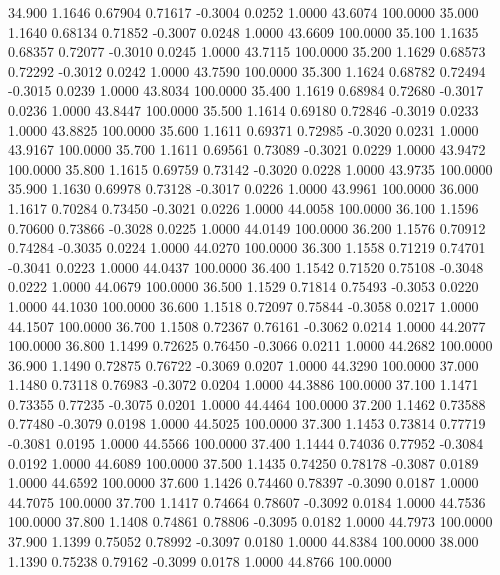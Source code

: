   34.900   1.1646   0.67904   0.71617  -0.3004   0.0252   1.0000  43.6074 100.0000
  35.000   1.1640   0.68134   0.71852  -0.3007   0.0248   1.0000  43.6609 100.0000
  35.100   1.1635   0.68357   0.72077  -0.3010   0.0245   1.0000  43.7115 100.0000
  35.200   1.1629   0.68573   0.72292  -0.3012   0.0242   1.0000  43.7590 100.0000
  35.300   1.1624   0.68782   0.72494  -0.3015   0.0239   1.0000  43.8034 100.0000
  35.400   1.1619   0.68984   0.72680  -0.3017   0.0236   1.0000  43.8447 100.0000
  35.500   1.1614   0.69180   0.72846  -0.3019   0.0233   1.0000  43.8825 100.0000
  35.600   1.1611   0.69371   0.72985  -0.3020   0.0231   1.0000  43.9167 100.0000
  35.700   1.1611   0.69561   0.73089  -0.3021   0.0229   1.0000  43.9472 100.0000
  35.800   1.1615   0.69759   0.73142  -0.3020   0.0228   1.0000  43.9735 100.0000
  35.900   1.1630   0.69978   0.73128  -0.3017   0.0226   1.0000  43.9961 100.0000
  36.000   1.1617   0.70284   0.73450  -0.3021   0.0226   1.0000  44.0058 100.0000
  36.100   1.1596   0.70600   0.73866  -0.3028   0.0225   1.0000  44.0149 100.0000
  36.200   1.1576   0.70912   0.74284  -0.3035   0.0224   1.0000  44.0270 100.0000
  36.300   1.1558   0.71219   0.74701  -0.3041   0.0223   1.0000  44.0437 100.0000
  36.400   1.1542   0.71520   0.75108  -0.3048   0.0222   1.0000  44.0679 100.0000
  36.500   1.1529   0.71814   0.75493  -0.3053   0.0220   1.0000  44.1030 100.0000
  36.600   1.1518   0.72097   0.75844  -0.3058   0.0217   1.0000  44.1507 100.0000
  36.700   1.1508   0.72367   0.76161  -0.3062   0.0214   1.0000  44.2077 100.0000
  36.800   1.1499   0.72625   0.76450  -0.3066   0.0211   1.0000  44.2682 100.0000
  36.900   1.1490   0.72875   0.76722  -0.3069   0.0207   1.0000  44.3290 100.0000
  37.000   1.1480   0.73118   0.76983  -0.3072   0.0204   1.0000  44.3886 100.0000
  37.100   1.1471   0.73355   0.77235  -0.3075   0.0201   1.0000  44.4464 100.0000
  37.200   1.1462   0.73588   0.77480  -0.3079   0.0198   1.0000  44.5025 100.0000
  37.300   1.1453   0.73814   0.77719  -0.3081   0.0195   1.0000  44.5566 100.0000
  37.400   1.1444   0.74036   0.77952  -0.3084   0.0192   1.0000  44.6089 100.0000
  37.500   1.1435   0.74250   0.78178  -0.3087   0.0189   1.0000  44.6592 100.0000
  37.600   1.1426   0.74460   0.78397  -0.3090   0.0187   1.0000  44.7075 100.0000
  37.700   1.1417   0.74664   0.78607  -0.3092   0.0184   1.0000  44.7536 100.0000
  37.800   1.1408   0.74861   0.78806  -0.3095   0.0182   1.0000  44.7973 100.0000
  37.900   1.1399   0.75052   0.78992  -0.3097   0.0180   1.0000  44.8384 100.0000
  38.000   1.1390   0.75238   0.79162  -0.3099   0.0178   1.0000  44.8766 100.0000
